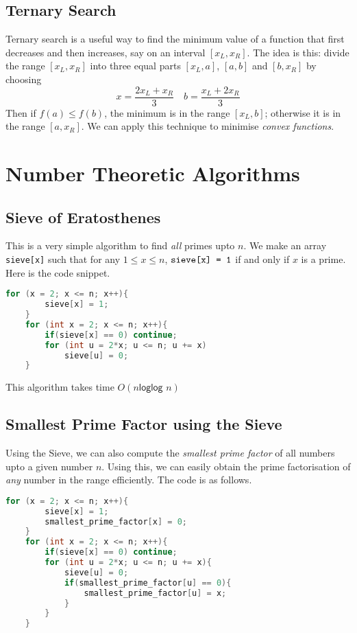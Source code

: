 \documentclass[12pt,a4paper]{amsart}
\numberwithin{equation}{section}
\theoremstyle{definition}
\begin{document}
\subsection{Ternary Search} Ternary search is a useful way to find the minimum value of a function that first decreases and then increases, say on an interval $[x_L , x_R]$. The idea is this: divide the range $[x_L , x_R]$ into three equal parts $[x_L , a]$, $[a , b]$ and $[b , x_R]$ by choosing
$$x = \dfrac{2x_L + x_R}{3}\quad b = \dfrac{x_L + 2x_R}{3}$$
Then if $f(a) \le f(b)$, the minimum is in the range $[x_L , b]$; otherwise it is in the range $[a , x_R]$. We can apply this technique to minimise \textit{convex functions}.

\section{Number Theoretic Algorithms}

\subsection{Sieve of Eratosthenes} This is a very simple algorithm to find \textit{all} primes upto $n$. We make an array \verb|sieve[x]| such that for any $1\le x\le n$, $\verb|sieve[x] = 1|$ if and only if $x$ is a prime. Here is the code snippet. 

\begin{lstlisting}[language=C++]
    for (x = 2; x <= n; x++){
        sieve[x] = 1;
    }
    for (int x = 2; x <= n; x++){
        if(sieve[x] == 0) continue;
        for (int u = 2*x; u <= n; u += x)
            sieve[u] = 0;
    }
\end{lstlisting}
This algorithm takes time $O(n\textsf{loglog }n)$

\subsection{Smallest Prime Factor using the Sieve} Using the Sieve, we can also compute the \textit{smallest prime factor} of all numbers upto a given number $n$. Using this, we can easily obtain the prime factorisation of \textit{any} number in the range efficiently. The code is as follows. 

\begin{lstlisting}[language=C++]
    for (x = 2; x <= n; x++){
        sieve[x] = 1;
        smallest_prime_factor[x] = 0;
    }
    for (int x = 2; x <= n; x++){
        if(sieve[x] == 0) continue;
        for (int u = 2*x; u <= n; u += x){
            sieve[u] = 0;
            if(smallest_prime_factor[u] == 0){
                smallest_prime_factor[u] = x;
            }
        }
    }
\end{lstlisting}
\end{document}
